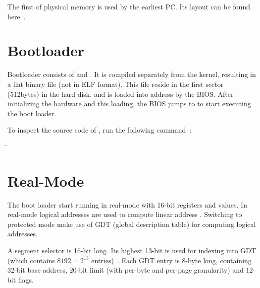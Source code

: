 \documentclass{article}
\begin{document}
The first  of physical memory is used by the earliest
PC. Its layout can be found here~\cite{yale-cs422-as1}.

\section{Bootloader}

Bootloader consists of  and . It is
compiled separately from the kernel, resulting in a flat binary file
 (not in ELF format). This file reside in the first
sector (512bytes) in the hard disk, and is loaded into address
\code{[0x7c00 - 0x7dff]} by the BIOS. After initializing the hardware
and this loading, the BIOS jumps to  to start executing
the boot loader.

To inspect the source code of , run the following command~\cite{disasm-flat}:

\begin{tabbing}
  \qquad\=\kill
  \> 
\end{tabbing}

\section{Real-Mode}

The boot loader start running in real-mode with 16-bit registers and
values. In real-mode logical addresses  are used
to compute linear address . Switching to
protected mode make use of GDT (global description table) for
computing logical addresses.

A segment selector  is 16-bit long. Its highest 13-bit
is used for indexing into GDT (which contains $8192 = 2^{13}$
entries)~\cite{jasoncc-mem}. Each GDT entry is $8$-byte long,
containing $32$-bit base address, $20$-bit limit (with per-byte and
per-page granularity) and $12$-bit flags.



\end{document}
